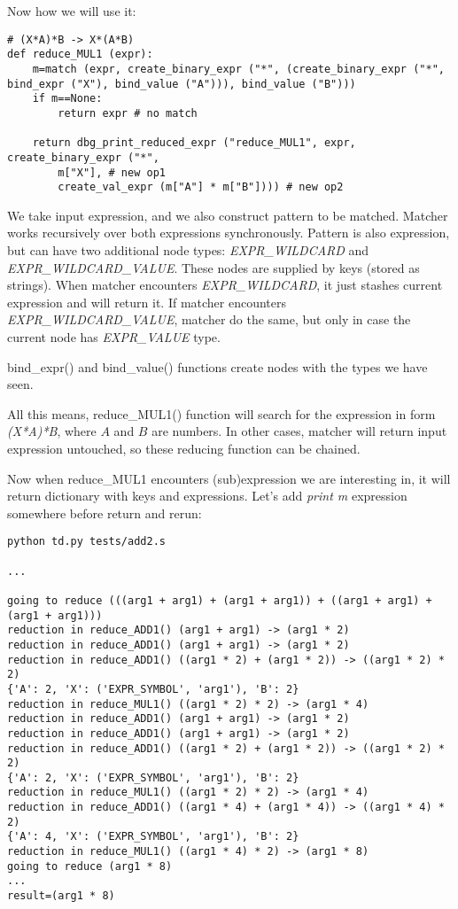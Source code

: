 ﻿\documentclass[12pt]{article}
\begin{document}
Now how we will use it:

\begin{lstlisting}
# (X*A)*B -> X*(A*B)
def reduce_MUL1 (expr):
    m=match (expr, create_binary_expr ("*", (create_binary_expr ("*", bind_expr ("X"), bind_value ("A"))), bind_value ("B")))
    if m==None:
        return expr # no match

    return dbg_print_reduced_expr ("reduce_MUL1", expr, create_binary_expr ("*", 
        m["X"], # new op1
        create_val_expr (m["A"] * m["B"]))) # new op2
\end{lstlisting}

We take input expression, and we also construct pattern to be matched.
Matcher works recursively over both expressions synchronously.
Pattern is also expression, but can have two additional node types: \textit{EXPR\_WILDCARD} and
\textit{EXPR\_WILDCARD\_VALUE}. These nodes are supplied by keys (stored as strings).
When matcher encounters \textit{EXPR\_WILDCARD}, it just stashes current expression and will return it.
If matcher encounters \textit{EXPR\_WILDCARD\_VALUE}, matcher do the same, but only in case the current node
has \textit{EXPR\_VALUE} type.

bind\_expr() and bind\_value() functions create nodes with the types we have seen.

All this means, reduce\_MUL1() function will search for the expression in form \textit{(X*A)*B}, where $A$ and $B$
are numbers. In other cases, matcher will return input expression untouched, so these reducing function can be chained.

Now when reduce\_MUL1 encounters (sub)expression we are interesting in, it will return dictionary with keys and expressions.
Let's add \textit{print m} expression somewhere before return and rerun:

\begin{lstlisting}
python td.py tests/add2.s

...

going to reduce (((arg1 + arg1) + (arg1 + arg1)) + ((arg1 + arg1) + (arg1 + arg1)))
reduction in reduce_ADD1() (arg1 + arg1) -> (arg1 * 2)
reduction in reduce_ADD1() (arg1 + arg1) -> (arg1 * 2)
reduction in reduce_ADD1() ((arg1 * 2) + (arg1 * 2)) -> ((arg1 * 2) * 2)
{'A': 2, 'X': ('EXPR_SYMBOL', 'arg1'), 'B': 2}
reduction in reduce_MUL1() ((arg1 * 2) * 2) -> (arg1 * 4)
reduction in reduce_ADD1() (arg1 + arg1) -> (arg1 * 2)
reduction in reduce_ADD1() (arg1 + arg1) -> (arg1 * 2)
reduction in reduce_ADD1() ((arg1 * 2) + (arg1 * 2)) -> ((arg1 * 2) * 2)
{'A': 2, 'X': ('EXPR_SYMBOL', 'arg1'), 'B': 2}
reduction in reduce_MUL1() ((arg1 * 2) * 2) -> (arg1 * 4)
reduction in reduce_ADD1() ((arg1 * 4) + (arg1 * 4)) -> ((arg1 * 4) * 2)
{'A': 4, 'X': ('EXPR_SYMBOL', 'arg1'), 'B': 2}
reduction in reduce_MUL1() ((arg1 * 4) * 2) -> (arg1 * 8)
going to reduce (arg1 * 8)
...
result=(arg1 * 8)
\end{lstlisting}
\end{document}

